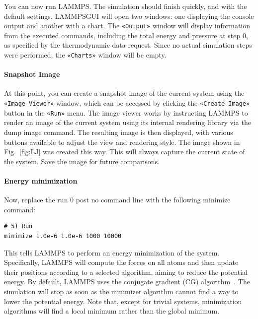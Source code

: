 \documentclass[9pt,tutorial]{livecoms}
\newcommand{\lmpcmd}[1]{\hspace{0pt}\colorbox{listing}{\textcolor{command}{\small{#1}}}\hspace{0pt}} %
\newcommand{\guicmd}[1]{\textcolor{command}{\texttt{«#1»}}} %
\newcommand{\lammpsgui}{\textsf{LAMMPS\textendash GUI}}
\begin{document}
You can now run LAMMPS.  The simulation should finish quickly, and with the default
settings, \lammpsgui{} will open two windows: one displaying the console
output and another with a chart.  The \guicmd{Output} window will display information from
the executed commands, including the total energy and pressure at step 0,
as specified by the thermodynamic data request.  Since no actual simulation
steps were performed, the \guicmd{Charts} window will be empty.

\paragraph{Snapshot Image}

At this point, you can create a snapshot image of the
current system using the \guicmd{Image Viewer} window, which can be
accessed by clicking the \guicmd{Create Image} button in the \guicmd{Run} menu.
The image viewer works by instructing LAMMPS to render an image of the current system using
its internal rendering library via the \lmpcmd{dump image} command.  The
resulting image is then displayed, with various buttons available to adjust
the view and rendering style.  The image shown in
Fig.~\ref{fig:LJ} was created this way.  This will always capture the current
state of the system.  Save the image for future comparisons.

\paragraph{Energy minimization}

Now, replace the \lmpcmd{run 0 post no} command line with the
following \lmpcmd{minimize} command:
\begin{lstlisting}
# 5) Run
minimize 1.0e-6 1.0e-6 1000 10000
\end{lstlisting}
This tells LAMMPS to perform an energy minimization of the system.
Specifically, LAMMPS will compute the forces on all atoms and then update their
positions according to a selected algorithm, aiming to reduce
the potential energy.  By default, LAMMPS uses the conjugate gradient (CG)
algorithm~\cite{hestenes1952methods}.  The simulation will stop as soon
as the minimizer algorithm cannot find a way to lower the potential
energy. %
Note that, except for trivial systems, minimization algorithms will find a
local minimum rather than the global minimum.
\end{document}
